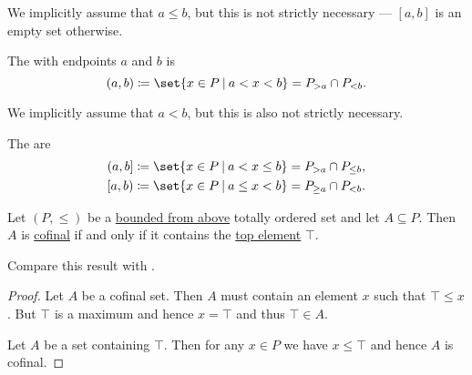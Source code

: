\begin{definition}
\begin{thmenum}
    We implicitly assume that \( a \leq b \), but this is not strictly necessary --- \( [a, b] \) is an empty set otherwise.

     The  with endpoints \( a \) and \( b \) is
    \begin{equation*}
      (a, b) \coloneqq \set{ x \in P \given a < x < b } = P_{> a} \cap P_{< b}.
    \end{equation*}

    We implicitly assume that \( a < b \), but this is also not strictly necessary.

     The  are
    \begin{equation*}
      \begin{aligned}
        (a, b] \coloneqq \set{ x \in P \given a < x \leq b } = P_{> a} \cap P_{\leq b},
        \\
        [a, b) \coloneqq \set{ x \in P \given a \leq x < b } = P_{\geq a} \cap P_{< b}.
      \end{aligned}
    \end{equation*}
  \end{thmenum}
\end{definition}

\begin{proposition}\label{thm:partially_ordered_cofinal_equivalences}
  Let \( (P, \leq) \) be a \hyperref[def:partially_ordered_set_extremal_points/upper_and_lower_bounds]{bounded from above} totally ordered set and let \( A \subseteq P \). Then \( A \) is \hyperref[def:cofinal_set]{cofinal} if and only if it contains the \hyperref[def:partially_ordered_set_extremal_points/top_and_bottom]{top element} \( \top \).

  Compare this result with .
\end{proposition}
\begin{proof}
  \SufficiencySubProof Let \( A \) be a cofinal set. Then \( A \) must contain an element \( x \) such that \( \top \leq x \). But \( \top \) is a maximum and hence \( x = \top \) and thus \( \top \in A \).

  \NecessitySubProof Let \( A \) be a set containing \( \top \). Then for any \( x \in P \) we have \( x \leq \top \) and hence \( A \) is cofinal.
\end{proof}

